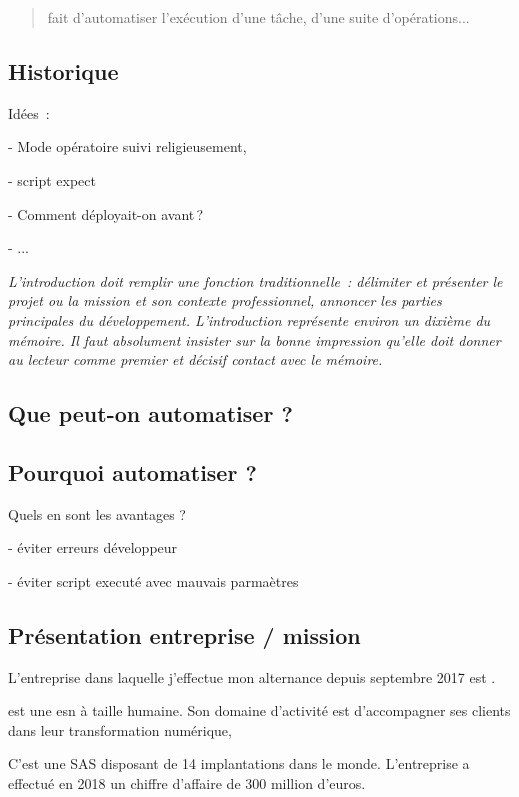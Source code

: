\begin{quote}
fait d'automatiser l'exécution d'une tâche, d'une suite d'opérations...
\end{quote}

\subsection{Historique}

Idées : 
	
- Mode opératoire suivi religieusement, 

- script expect

- Comment déployait-on avant ?

-  ...


\textit{L’introduction doit remplir une fonction traditionnelle : délimiter et présenter le projet ou la mission et son contexte professionnel, annoncer les parties principales du développement. L’introduction représente environ un dixième du mémoire. Il faut absolument insister sur la bonne impression qu’elle doit donner au lecteur comme premier et décisif contact avec le mémoire.}

\subsection{Que peut-on automatiser ?}

\subsection{Pourquoi automatiser ?}

Quels en sont les avantages ?

- éviter erreurs développeur

- éviter script executé avec mauvais parmaètres

\subsection{Présentation entreprise / mission}

L'entreprise dans laquelle j'effectue mon alternance depuis septembre 2017 est \onepoint. 

\xmakefirstuc{\onepoint{}} est une \gls{esn} à taille humaine. Son domaine d'activité est d'accompagner ses clients dans leur transformation numérique, 

C'est une \gls{SAS} disposant de 14 implantations dans le monde. L'entreprise a effectué en 2018 un chiffre d'affaire de 300 million d'euros.

